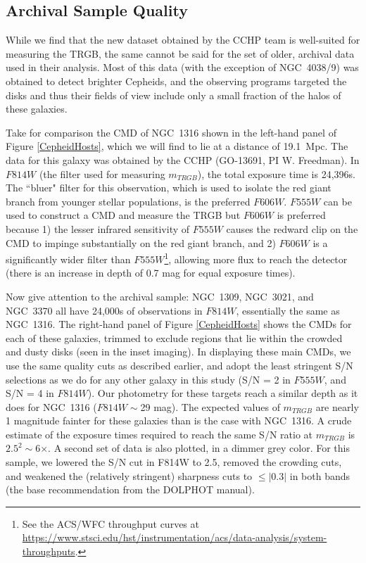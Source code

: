 \documentclass[twocolumn]{aastex62}
\begin{document}
\subsection{Archival Sample Quality}

While we find that the new dataset obtained by the CCHP team is well-suited for measuring the TRGB, the same cannot be said for the set of older, archival data used in their analysis. Most of this data (with the exception of NGC~4038/9) was obtained to detect brighter Cepheids, and the observing programs targeted the disks and thus their fields of view include only a small fraction of the halos of these galaxies.

Take for comparison the CMD of NGC~1316 shown in the left-hand panel of Figure \ref{CepheidHosts}, which we will find to lie at a distance of 19.1~Mpc. The data for this galaxy was obtained by the CCHP (GO-13691, PI W. Freedman). In $F814W$ (the filter used for measuring $m_{TRGB}$), the total exposure time is 24,396s. The ``bluer" filter for this observation, which is used to isolate the red giant branch from younger stellar populations, is the preferred $F606W$. $F555W$ can be used to construct a CMD and measure the TRGB but $F606W$ is preferred because 1) the lesser infrared sensitivity of $F555W$ causes the redward clip on the CMD to impinge substantially on the red giant branch, and 2) $F606W$ is a significantly wider filter than $F555W$\footnote{See the ACS/WFC throughput curves at \url{https://www.stsci.edu/hst/instrumentation/acs/data-analysis/system-throughputs}.}, allowing more flux to reach the detector (there is an increase in depth of 0.7 mag for equal exposure times).


Now give attention to the archival sample: NGC~1309, NGC~3021, and NGC~3370 all have 24,000s of observations in $F814W$, essentially the same as NGC~1316. The right-hand panel of Figure \ref{CepheidHosts} shows the CMDs for each of these galaxies, trimmed to exclude regions that lie within the crowded and dusty disks (seen in the inset imaging). In displaying these main CMDs, we use the same quality cuts as described earlier, and adopt the least stringent S/N selections as we do for any other galaxy in this study (S/N = 2 in $F555W$, and S/N = 4 in $F814W$). Our photometry for these targets reach a similar depth as it does for NGC~1316 ($F814W\sim$29 mag). The expected values of $m_{TRGB}$ are nearly 1 magnitude fainter for these galaxies than is the case with NGC~1316. A crude estimate of the exposure times required to reach the same S/N ratio at $m_{TRGB}$ is $2.5^{2} \sim$6$\times$. A second set of data is also plotted, in a dimmer grey color. For this sample, we lowered the S/N cut in F814W to 2.5, removed the crowding cuts, and weakened the (relatively stringent) sharpness cuts to $\le |0.3|$ in both bands (the base recommendation from the DOLPHOT manual).
\end{document}
